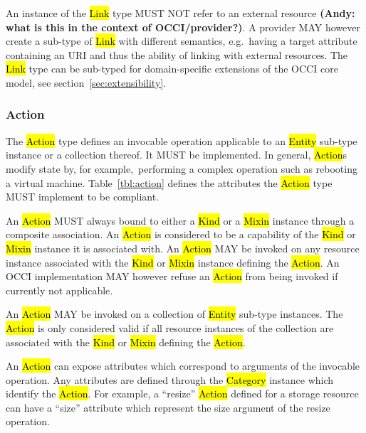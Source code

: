 \documentclass[10pt,a4paper]{article}
\begin{document}
An instance of the \hl{Link} type MUST NOT refer to an external resource
\textbf{(Andy: what is this in the context of OCCI/provider?)}.  A
provider MAY however create a sub-type of \hl{Link} with different semantics,
e.g.~having a target attribute containing an URI and thus the ability of linking
with external resources.
%
The \hl{Link} type can be sub-typed for domain-specific extensions of the
OCCI core model, see section~\ref{sec:extensibility}.

\subsubsection{Action}
The \hl{Action} type defines an invocable operation applicable to an \hl{Entity}
sub-type instance or a collection thereof. It MUST be implemented. In general,
\hl{Action}s modify state by, for example,~performing a complex operation such as
rebooting a virtual machine.
%
Table~\ref{tbl:action} defines the attributes the \hl{Action} type MUST
implement to be compliant.


An \hl{Action} MUST always bound to either a \hl{Kind} or a \hl{Mixin} instance
through a composite association. An \hl{Action} is considered to be a
capability of the \hl{Kind} or \hl{Mixin} instance it is associated with.  An
\hl{Action} MAY be invoked on any resource instance associated with the
\hl{Kind} or \hl{Mixin} instance defining the \hl{Action}. An OCCI
implementation MAY however refuse an \hl{Action} from being invoked if
currently not applicable.

An \hl{Action} MAY be invoked on a collection of \hl{Entity} sub-type
instances. The \hl{Action} is only considered valid if all resource instances
of the collection are associated with the \hl{Kind} or \hl{Mixin} defining the
\hl{Action}.

An \hl{Action} can expose attributes which correspond to arguments of the
invocable operation.  Any attributes are defined through the \hl{Category}
instance which identify the \hl{Action}. For example, a ``resize'' \hl{Action}
defined for a storage resource can have a ``size'' attribute which represent the
size argument of the resize operation.
\end{document}
